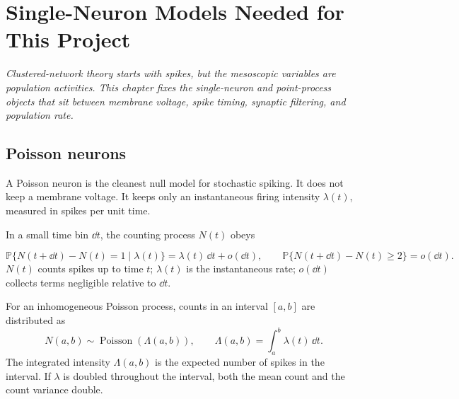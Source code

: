 \chapter{Single-Neuron Models Needed for This Project}
\label{ch:single-neuron-models}

\textit{Clustered-network theory starts with spikes, but the mesoscopic variables are population activities. This chapter fixes the single-neuron and point-process objects that sit between membrane voltage, spike timing, synaptic filtering, and population rate.}


\section{Poisson neurons}
\label{sec:poisson-neurons}

A Poisson neuron is the cleanest null model for stochastic spiking. It does not keep a membrane voltage. It keeps only an instantaneous firing intensity $\lambda(t)$, measured in spikes per unit time.

In a small time bin $\dd t$, the counting process $N(t)$ obeys
%
\begin{keyequation}
\begin{equation}
  \mathbb{P}\{N(t+\dd t)-N(t)=1\mid \lambda(t)\}
  =
  \lambda(t)\,\dd t+o(\dd t),
  \qquad
  \mathbb{P}\{N(t+\dd t)-N(t)\geq 2\}=o(\dd t).
  \label{eq:poisson-spiking-rule}
\end{equation}
\tcblower
$N(t)$ counts spikes up to time $t$; $\lambda(t)$ is the instantaneous rate; $o(\dd t)$ collects terms negligible relative to $\dd t$.
\end{keyequation}

\noindent For an inhomogeneous Poisson process, counts in an interval $[a,b]$ are distributed as
%
\begin{equation}
  N(a,b) \sim \operatorname{Poisson}\!\left(\Lambda(a,b)\right),
  \qquad
  \Lambda(a,b)=\int_a^b \lambda(t)\,\dd t .
  \label{eq:inhomogeneous-poisson-count}
\end{equation}
%
The integrated intensity $\Lambda(a,b)$ is the expected number of spikes in the interval. If $\lambda$ is doubled throughout the interval, both the mean count and the count variance double.

